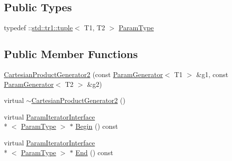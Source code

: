 \subsection*{Public Types}
\begin{DoxyCompactItemize}
\item 
typedef \-::\hyperlink{classstd_1_1tr1_1_1tuple}{std\-::tr1\-::tuple}$<$ T1, T2 $>$ \hyperlink{classtesting_1_1internal_1_1CartesianProductGenerator2_a036b6f14a61a69fac5d21dd7ff5b8913}{Param\-Type}
\end{DoxyCompactItemize}
\subsection*{Public Member Functions}
\begin{DoxyCompactItemize}
\item 
\hyperlink{classtesting_1_1internal_1_1CartesianProductGenerator2_a971ef5a45783db277f5fae84eaef41a3}{Cartesian\-Product\-Generator2} (const \hyperlink{classtesting_1_1internal_1_1ParamGenerator}{Param\-Generator}$<$ T1 $>$ \&g1, const \hyperlink{classtesting_1_1internal_1_1ParamGenerator}{Param\-Generator}$<$ T2 $>$ \&g2)
\item 
virtual \hyperlink{classtesting_1_1internal_1_1CartesianProductGenerator2_a0c7875565b4942e3c3f5aed303722c75}{$\sim$\-Cartesian\-Product\-Generator2} ()
\item 
virtual \hyperlink{classtesting_1_1internal_1_1ParamIteratorInterface}{Param\-Iterator\-Interface}\\*
$<$ \hyperlink{classtesting_1_1internal_1_1CartesianProductGenerator2_a036b6f14a61a69fac5d21dd7ff5b8913}{Param\-Type} $>$ $\ast$ \hyperlink{classtesting_1_1internal_1_1CartesianProductGenerator2_a0897553749c928a1ee5ea7b581d2d59b}{Begin} () const 
\item 
virtual \hyperlink{classtesting_1_1internal_1_1ParamIteratorInterface}{Param\-Iterator\-Interface}\\*
$<$ \hyperlink{classtesting_1_1internal_1_1CartesianProductGenerator2_a036b6f14a61a69fac5d21dd7ff5b8913}{Param\-Type} $>$ $\ast$ \hyperlink{classtesting_1_1internal_1_1CartesianProductGenerator2_a3b02163a9c9d5f0e930b0740de7e876a}{End} () const 
\end{DoxyCompactItemize}


